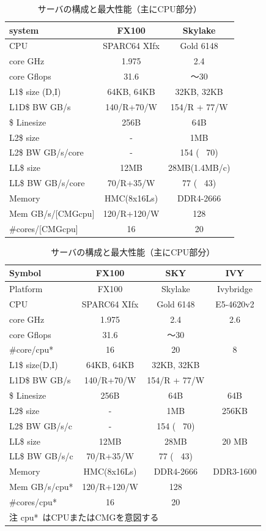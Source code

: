 \documentclass[submit,techrep,noauthor]{ipsj}
\begin{document}
\begin{table}[b]
\scriptsize
\caption{サーバの構成と最大性能（主にCPU部分）}
\label{tab:server-config}
\footnotesize

\ifTwoservers
\begin{tabular}{l|c|c} \hline
\scriptsize
system			&	FX100	&	Skylake	\\ \hline
CPU				&	SPARC64 XIfx	&	Gold 6148	\\ \hline
core GHz		&	1.975	&	2.4	\\ \hline
core Gflops	&	31.6	&	〜30	\\ \hline
L1\$ size (D,I)		&	64KB, 64KB	&	32KB, 32KB	\\ \hline
L1D\$ BW GB/s	&	140/R+70/W	&	154/R + 77/W	\\ \hline
\$ Linesize 	&	256B	&	64B	\\ \hline
L2\$ size		&	-	&	1MB	\\ \hline
L2\$ BW GB/s/core	&	-	&	154 ( ~70)	\\ \hline
LL\$ size		&	12MB	&	28MB(1.4MB/c)	\\ \hline
LL\$ BW GB/s/core	&	70/R+35/W	&	77 ( ~43)	\\ \hline
Memory			&	HMC(8x16Ls)	&	DDR4-2666	\\ \hline
Mem GB/s/[CMGcpu]	&	120/R+120/W	&	128	\\ \hline
\#cores/[CMGcpu]	&	16	&	20	\\ \hline
\end{tabular}
\fi

\ifThreeservers
\begin{tabular}{l|c|c|c} \hline
\scriptsize
Symbol			&	FX100	&	SKY		&	IVY \\ \hline
Platform		&	FX100	&	Skylake & Ivybridge\\ \hline
CPU				&	SPARC64 XIfx	&	Gold 6148	&	E5-4620v2	\\ \hline
core GHz		&	1.975	&	2.4	&	2.6 \\ \hline
core Gflops	&	31.6	&	〜30	\\ \hline
\#core/cpu*	&	16	&	20	&	8	\\ \hline
L1\$ size(D,I)		&	64KB, 64KB	&	32KB, 32KB	\\ \hline
L1D\$ BW GB/s	&	140/R+70/W	&	154/R + 77/W	\\ \hline
\$ Linesize 	&	256B	&	64B	&	64B	\\ \hline
L2\$ size		&	-	&	1MB	&	256KB	\\ \hline
L2\$ BW GB/s/c	&	-	&	154 ( ~70)	\\ \hline
LL\$ size		&	12MB	&	28MB	&	20 MB	\\ \hline
LL\$ BW GB/s/c	&	70/R+35/W	&	77 ( ~43)	\\ \hline
Memory			&	HMC(8x16Ls)	&	DDR4-2666	& DDR3-1600	\\ \hline
Mem GB/s/cpu*	&	120/R+120/W	&	128	\\ \hline
\#cores/cpu*	&	16	&	20	\\ \hline
\multicolumn{4}{l}{\scriptsize\hspace{5mm} 注 cpu* はCPUまたはCMGを意図する}\\
\end{tabular}
\fi

\end{table}
\end{document}
